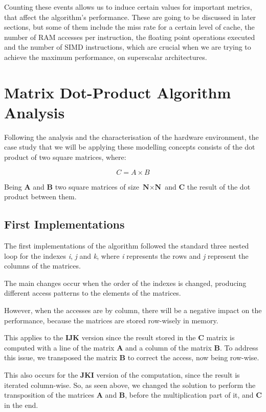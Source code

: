 \documentclass[twoside,twocolumn]{article}
\begin{document}
Counting these events allows us to induce certain values for important metrics, that affect the algorithm's performance. These are going to be discussed in later sections, but some of them include the miss rate for a certain level of cache, the number of RAM accesses per instruction, the floating point operations executed and the number of SIMD instructions, which are crucial when we are trying to achieve the maximum performance, on superscalar architectures.

\section{Matrix Dot-Product Algorithm Analysis}

Following the analysis and the characterisation of the hardware environment, the case study that we will be applying these modelling concepts consists of the dot product of two square matrices, where:

$$C = A \times B$$

Being \textbf{A} and \textbf{B} two square matrices of size $\textbf{N} \times \textbf{N}$ and \textbf{C} the result of the dot product between them.

\subsection{First Implementations}

The first implementations of the algorithm followed the standard three nested loop for the indexes \emph{i}, \emph{j} and \emph{k}, where \emph{i} represents the rows and \emph{j} represent the columns of the matrices.

The main changes occur when the order of the indexes is changed, producing different access patterns to the elements of the matrices.

However, when the accesses are by column, there will be a negative impact on the performance, because the matrices are stored row-wisely in memory.

This applies to the \textbf{IJK} version since the result stored in the \textbf{C} matrix is computed with a line of the matrix \textbf{A} and a column of the matrix \textbf{B}.  To address this issue, we transposed the matrix \textbf{B} to correct the access, now being row-wise.

This also occurs for the \textbf{JKI} version of the computation, since the result is iterated column-wise. So, as seen above, we changed the solution to perform the transposition of the matrices \textbf{A} and \textbf{B}, before the multiplication part of it, and \textbf{C} in the end.
\end{document}

